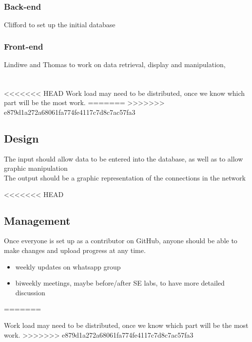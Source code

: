 \documentclass[11pt]{article}
\begin{document}
\subsubsection{Back-end}
Clifford to set up the initial database
\subsubsection{Front-end}
Lindiwe and Thomas to work on data retrieval, display and manipulation, 
\\
\\
\\
<<<<<<< HEAD
Work load may need to be distributed, once we know which part will be the most work.
=======
>>>>>>> e879d1a272a68061fa774fe4117c7d8c7ac57fa3

\subsection{Design}
The input should allow data to be entered into the database, as well as to allow graphic manipulation\\
The output should be a graphic representation of the connections in the network

<<<<<<< HEAD
\subsection{Management}
Once everyone is set up as a contributor on GitHub, anyone should be able to make changes and upload progress at any time. 
\begin{itemize}
\item weekly updates on whatsapp group
\item biweekly meetings, maybe before/after SE labs, to have more detailed discussion
\end{itemize}

=======

Work load may need to be distributed, once we know which part will be the most work.
>>>>>>> e879d1a272a68061fa774fe4117c7d8c7ac57fa3
\end{document}
